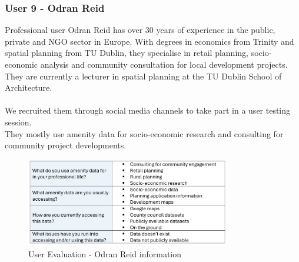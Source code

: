 \newpage
\subsubsection{User 9 - Odran Reid}
Professional user Odran Reid has over 30 years of experience in the public, private and NGO sector in Europe. With degrees in economics from Trinity and spatial planning from TU Dublin, they specialise in retail planning, socio-economic analysis and community consultation for local development projects. They are currently a lecturer in spatial planning at the TU Dublin School of Architecture.\\ \\
We recruited them through social media channels to take part in a user testing session.\\
They mostly use amenity data for socio-economic research and consulting for community project developments.\\
\begin{figure}[h!]
    \centering
    \includegraphics[width=0.8\textwidth]{images/odran-amenity-info.png}
    \caption{User Evaluation - Odran Reid information}
\end{figure}

